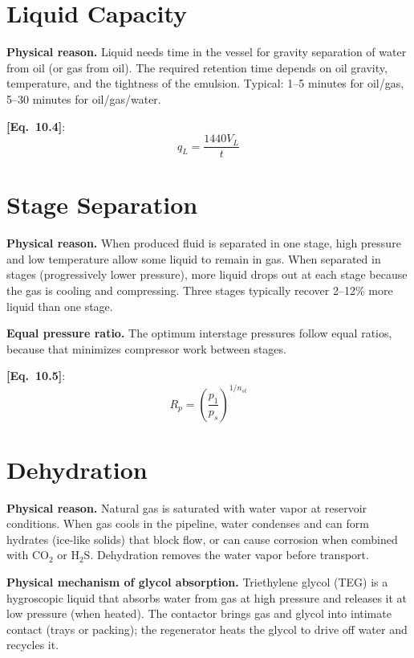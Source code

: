 \documentclass[11pt,a4paper,openany]{book}
\newcommand{\eqrefbook}[1]{\textcolor{blue!60!black}{\textbf{[Eq.~#1]}}}
\begin{document}
\section{Liquid Capacity}

\begin{theory}
\textbf{Physical reason.} Liquid needs time in the vessel for gravity
separation of water from oil (or gas from oil). The required retention
time depends on oil gravity, temperature, and the tightness of the
emulsion. Typical: 1--5 minutes for oil/gas, 5--30 minutes for
oil/gas/water.
\end{theory}

\eqrefbook{10.4}:
\begin{equation}
  q_L = \frac{1440 V_L}{t}
\end{equation}

\section{Stage Separation}

\begin{theory}
\textbf{Physical reason.} When produced fluid is separated in one
stage, high pressure and low temperature allow some liquid to remain
in gas. When separated in stages (progressively lower pressure), more
liquid drops out at each stage because the gas is cooling and
compressing. Three stages typically recover 2--12\% more liquid than
one stage.

\textbf{Equal pressure ratio.} The optimum interstage pressures follow
equal ratios, because that minimizes compressor work between stages.
\end{theory}

\eqrefbook{10.5}:
\begin{equation}
  R_p = \left(\frac{p_1}{p_s}\right)^{1/n_{st}}
\end{equation}

\section{Dehydration}

\begin{theory}
\textbf{Physical reason.} Natural gas is saturated with water vapor
at reservoir conditions. When gas cools in the pipeline, water
condenses and can form hydrates (ice-like solids) that block flow, or
can cause corrosion when combined with CO$_2$ or H$_2$S. Dehydration
removes the water vapor before transport.

\textbf{Physical mechanism of glycol absorption.} Triethylene glycol
(TEG) is a hygroscopic liquid that absorbs water from gas at high
pressure and releases it at low pressure (when heated). The contactor
brings gas and glycol into intimate contact (trays or packing); the
regenerator heats the glycol to drive off water and recycles it.
\end{theory}
\end{document}
